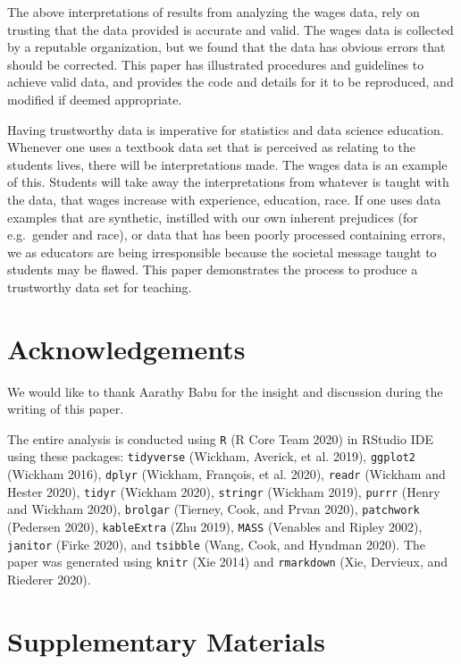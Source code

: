 \documentclass{article}
\begin{document}
The above interpretations of results from analyzing the wages data, rely on trusting that the data provided is accurate and valid. The wages data is collected by a reputable organization, but we found that the data has obvious errors that should be corrected. This paper has illustrated procedures and guidelines to achieve valid data, and provides the code and details for it to be reproduced, and modified if deemed appropriate.

Having trustworthy data is imperative for statistics and data science education. Whenever one uses a textbook data set that is perceived as relating to the students lives, there will be interpretations made. The wages data is an example of this. Students will take away the interpretations from whatever is taught with the data, that wages increase with experience, education, race. If one uses data examples that are synthetic, instilled with our own inherent prejudices (for e.g.~gender and race), or data that has been poorly processed containing errors, we as educators are being irresponsible because the societal message taught to students may be flawed. This paper demonstrates the process to produce a trustworthy data set for teaching.

\hypertarget{acknowledgements}{%
\section{Acknowledgements}\label{acknowledgements}}

We would like to thank Aarathy Babu for the insight and discussion during the writing of this paper.

The entire analysis is conducted using \texttt{R} (R Core Team 2020) in RStudio IDE using these packages: \texttt{tidyverse} (Wickham, Averick, et al. 2019), \texttt{ggplot2} (Wickham 2016), \texttt{dplyr} (Wickham, François, et al. 2020), \texttt{readr} (Wickham and Hester 2020), \texttt{tidyr} (Wickham 2020), \texttt{stringr} (Wickham 2019), \texttt{purrr} (Henry and Wickham 2020), \texttt{brolgar} (Tierney, Cook, and Prvan 2020), \texttt{patchwork} (Pedersen 2020), \texttt{kableExtra} (Zhu 2019), \texttt{MASS} (Venables and Ripley 2002), \texttt{janitor} (Firke 2020), and \texttt{tsibble} (Wang, Cook, and Hyndman 2020). The paper was generated using \texttt{knitr} (Xie 2014) and \texttt{rmarkdown} (Xie, Dervieux, and Riederer 2020).

\hypertarget{supplementary-materials}{%
\section{Supplementary Materials}\label{supplementary-materials}}
\end{document}
